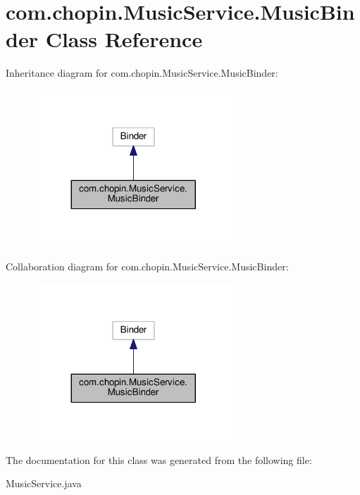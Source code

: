 \hypertarget{classcom_1_1chopin_1_1MusicService_1_1MusicBinder}{}\section{com.\+chopin.\+Music\+Service.\+Music\+Binder Class Reference}
\label{classcom_1_1chopin_1_1MusicService_1_1MusicBinder}


Inheritance diagram for com.\+chopin.\+Music\+Service.\+Music\+Binder\+:
\nopagebreak
\begin{figure}[H]
\begin{center}
\leavevmode
\includegraphics[width=212pt]{classcom_1_1chopin_1_1MusicService_1_1MusicBinder__inherit__graph}
\end{center}
\end{figure}


Collaboration diagram for com.\+chopin.\+Music\+Service.\+Music\+Binder\+:
\nopagebreak
\begin{figure}[H]
\begin{center}
\leavevmode
\includegraphics[width=212pt]{classcom_1_1chopin_1_1MusicService_1_1MusicBinder__coll__graph}
\end{center}
\end{figure}


The documentation for this class was generated from the following file\+:\begin{DoxyCompactItemize}
\item 
Music\+Service.\+java\end{DoxyCompactItemize}
